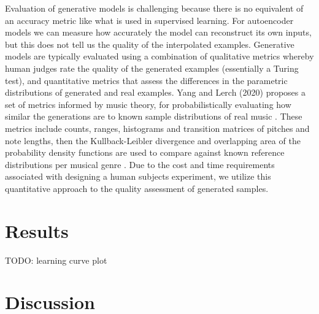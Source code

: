 \documentclass[sigconf,authorversion]{acmart}
\begin{document}
Evaluation of generative models is challenging because there is no
equivalent of an accuracy metric like what is used in supervised
learning. For autoencoder models we can measure how accurately the
model can reconstruct its own inputs, but this does not tell us the
quality of the interpolated examples. Generative models are typically
evaluated using a combination of qualitative metrics whereby human
judges rate the quality of the generated examples (essentially a
Turing test), and quantitative metrics that assess the differences in
the parametric distributions of generated and real examples. Yang and
Lerch (2020) proposes a set of metrics informed by music theory, for
probabilistically evaluating how similar the generations are to known
sample distributions of real music \cite{yang_evaluation_2020}. These
metrics include counts, ranges, histograms and transition matrices of
pitches and note lengths, then the Kullback-Leibler divergence and
overlapping area of the probability density functions are used to
compare against known reference distributions per musical genre
\cite{yang_evaluation_2020}. Due to the cost and time requirements
associated with designing a human subjects experiment, we
utilize this quantitative approach to the quality assessment of
generated samples.

\section{Results}

TODO: learning curve plot



\section{Discussion}



\end{document}
